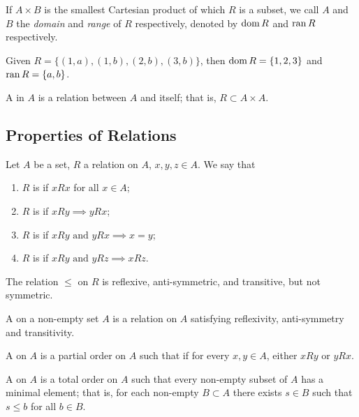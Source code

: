 If $A \times B$ is the smallest Cartesian product of which $R$ is a subset, we call $A$ and $B$ the \emph{domain} and \emph{range} of $R$ respectively, denoted by $\operatorname{dom} R$ and $\operatorname{ran} R$ respectively.

\begin{example}
Given $R=\{(1,a),(1,b),(2,b),(3,b)\}$, then $\operatorname{dom} R=\{1,2,3\}$ and $\operatorname{ran} R=\{a,b\}$.
\end{example}

\begin{definition}
A  in $A$ is a relation between $A$ and itself; that is, $R \subset A \times A$.
\end{definition}

\subsection{Properties of Relations}
Let $A$ be a set, $R$ a relation on $A$, $x,y,z \in A$. We say that
\begin{enumerate}[label=(\roman*)]
\item $R$ is  if $xRx$ for all $x\in A$;
\item $R$ is  if $xRy \implies yRx$;
\item $R$ is  if $xRy \text{ and } yRx \implies x=y$;
\item $R$ is  if $xRy \text{ and } yRz \implies xRz$.
\end{enumerate}

\begin{example}
The relation $\le$ on $R$ is reflexive, anti-symmetric, and transitive, but not symmetric. 
\end{example}

\begin{definition}
A  on a non-empty set $A$ is a relation on $A$ satisfying reflexivity, anti-symmetry and transitivity.

A  on $A$ is a partial order on $A$ such that if for every $x,y\in A$, either $xRy$ or $yRx$.

A  on $A$ is a total order on $A$ such that every non-empty subset of $A$ has a minimal element; that is, for each non-empty $B\subset A$ there exists $s\in B$ such that $s\le b$ for all $b\in B$.
\end{definition}

